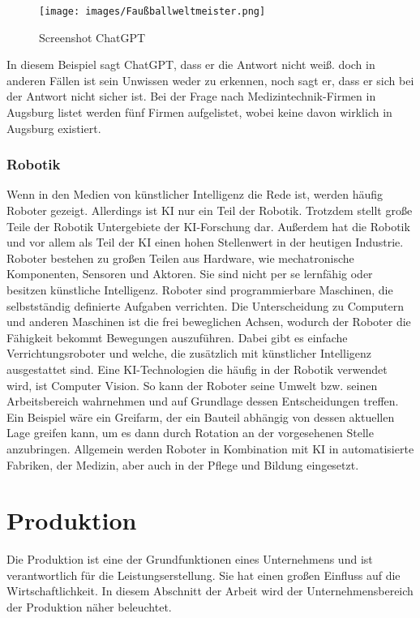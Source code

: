 \documentclass[a4paper,12pt, german]{report}
\begin{document}
\begin{figure}[H]
  \center
 \texttt{[image: images/Faußballweltmeister.png]}
  \caption[Screenshot ChatGPT]{Screenshot ChatGPT}
\end{figure}

In diesem Beispiel sagt ChatGPT, dass er die Antwort nicht weiß. doch in anderen Fällen ist sein Unwissen weder zu erkennen, noch sagt er, dass er sich bei der Antwort nicht sicher ist. Bei der Frage nach Medizintechnik-Firmen in Augsburg listet werden fünf Firmen aufgelistet, wobei keine davon wirklich in Augsburg existiert.

\subsubsection{Robotik} 

Wenn in den Medien von künstlicher Intelligenz die Rede ist, werden häufig Roboter gezeigt. Allerdings ist KI nur ein Teil der Robotik. Trotzdem stellt große Teile der Robotik Untergebiete der KI-Forschung dar. Außerdem hat die Robotik und vor allem als Teil der KI einen hohen Stellenwert in der heutigen Industrie.
Roboter bestehen zu großen Teilen aus Hardware, wie mechatronische Komponenten, Sensoren und Aktoren. Sie sind nicht per se lernfähig oder besitzen künstliche Intelligenz. Roboter sind programmierbare Maschinen, die selbstständig definierte Aufgaben verrichten. Die Unterscheidung zu Computern und anderen Maschinen ist die frei beweglichen Achsen, wodurch der Roboter die Fähigkeit bekommt Bewegungen auszuführen. Dabei gibt es einfache Verrichtungsroboter und welche, die zusätzlich mit künstlicher Intelligenz ausgestattet sind. 
Eine KI-Technologien die häufig in der Robotik verwendet wird, ist Computer Vision. So kann der Roboter seine Umwelt bzw. seinen Arbeitsbereich wahrnehmen und auf Grundlage dessen Entscheidungen treffen. Ein Beispiel wäre ein Greifarm, der ein Bauteil abhängig von dessen aktuellen Lage greifen kann, um es dann durch Rotation an der vorgesehenen Stelle anzubringen.
Allgemein werden Roboter in Kombination mit KI in automatisierte Fabriken, der Medizin, aber auch in der Pflege und Bildung eingesetzt. \cite{19}

\section{Produktion}

Die Produktion ist eine der Grundfunktionen eines Unternehmens und ist verantwortlich für die Leistungserstellung. Sie hat einen großen Einfluss auf die Wirtschaftlichkeit. In diesem Abschnitt der Arbeit wird der Unternehmensbereich der Produktion näher beleuchtet.
\end{document}
